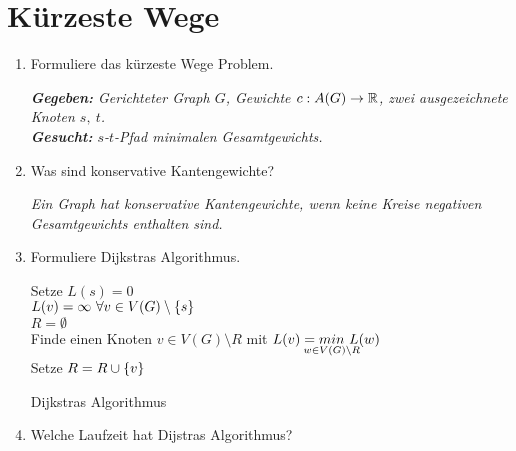 \documentclass[a4paper,10pt]{scrreprt}
\begin{document}
	\section{Kürzeste Wege}
	\begin{enumerate}
		\item Formuliere das kürzeste Wege Problem.
		
		\textit{\hspace*{10pt}\textbf{Gegeben: }Gerichteter Graph $G$, Gewichte $c:A(G)\to \mathbb{R}$, zwei ausgezeichnete \hspace*{56pt} Knoten $s,~t$.\\[5pt]
			\hspace*{10pt}\textbf{Gesucht: }$s$-$t$-Pfad minimalen Gesamtgewichts.}
		\item Was sind konservative Kantengewichte?
		
		\textit{Ein Graph hat konservative Kantengewichte, wenn keine Kreise negativen Gesamtgewichts enthalten sind.}
		\item Formuliere Dijkstras Algorithmus.
		\begin{algorithm}
			\vspace*{5pt}
			Setze $L(s) = 0$\\
			\hspace*{25pt}$L(v) = \infty~\forall v \in V(G)\setminus \{s\}$\\
			\hspace*{25pt}$R = \emptyset$\\
			Finde einen Knoten $v\in V(G)\setminus R$ mit $L(v) = \underset{\mathclap{w\in V(G)\setminus R}}{min}~L(w)$\\
			Setze $R = R \cup \{v\}$\\
			\caption{Dijkstras Algorithmus}
		\end{algorithm}
		\item Welche Laufzeit hat Dijstras Algorithmus?
		

\end{enumerate}
\end{document}

